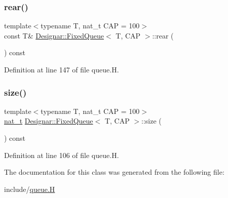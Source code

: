 \subsubsection{\texorpdfstring{rear()}{rear()}\hspace{0.1cm}{\footnotesize\ttfamily [2/2]}}
{\footnotesize\ttfamily template$<$typename T, nat\+\_\+t C\+AP = 100$>$ \\
const T\& \hyperlink{class_designar_1_1_fixed_queue}{Designar\+::\+Fixed\+Queue}$<$ T, C\+AP $>$\+::rear (\begin{DoxyParamCaption}{ }\end{DoxyParamCaption}) const\hspace{0.3cm}{\ttfamily [inline]}}



Definition at line 147 of file queue.\+H.

\mbox{\label{class_designar_1_1_fixed_queue_a9fa2f855edd54de0c847c8ba35c804cf}} 
\subsubsection{\texorpdfstring{size()}{size()}}
{\footnotesize\ttfamily template$<$typename T, nat\+\_\+t C\+AP = 100$>$ \\
\hyperlink{namespace_designar_aa72662848b9f4815e7bf31a7cf3e33d1}{nat\+\_\+t} \hyperlink{class_designar_1_1_fixed_queue}{Designar\+::\+Fixed\+Queue}$<$ T, C\+AP $>$\+::size (\begin{DoxyParamCaption}{ }\end{DoxyParamCaption}) const\hspace{0.3cm}{\ttfamily [inline]}}



Definition at line 106 of file queue.\+H.



The documentation for this class was generated from the following file\+:\begin{DoxyCompactItemize}
\item 
include/\hyperlink{queue_8_h}{queue.\+H}\end{DoxyCompactItemize}
